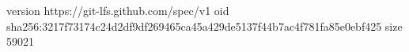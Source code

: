 version https://git-lfs.github.com/spec/v1
oid sha256:3217f73174c24d2df9df269465ca45a429de5137f44b7ac4f781fa85e0ebf425
size 59021
